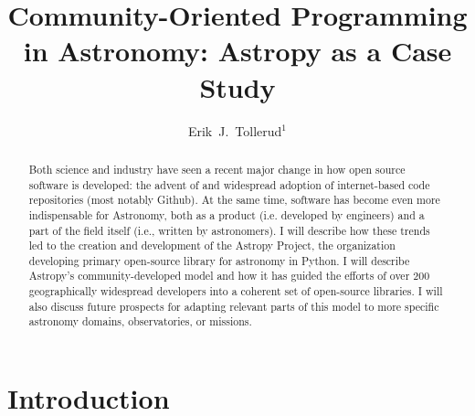 \documentclass[11pt,twoside]{article}
\begin{document}
\title{Community-Oriented Programming in Astronomy: Astropy as a Case Study}

\author{Erik~J.~Tollerud$^1$
}


\begin{abstract}
Both science and industry have seen a recent major change in how open source software is developed: the advent of and widespread adoption of internet-based code repositories (most notably Github). At the same time, software has become even more indispensable for Astronomy, both as a product (i.e. developed by engineers) and a part of the field itself (i.e., written by astronomers). I will describe how these trends led to the creation and development of the Astropy Project, the organization developing primary open-source library for astronomy in Python.  I will describe Astropy's community-developed model and how it has guided the efforts of over 200 geographically widespread developers into a coherent set of open-source libraries. I will also discuss future prospects for adapting relevant parts of this model to more specific astronomy domains, observatories, or missions.
\end{abstract}


\section{Introduction}
\end{document}
